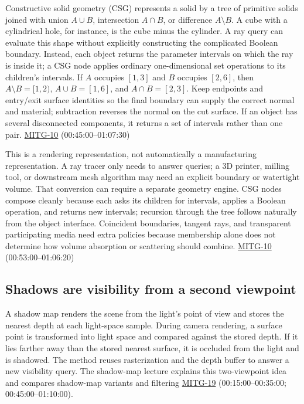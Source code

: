 Constructive solid geometry (CSG) represents a solid by a tree of primitive solids joined with union \(A\cup B\), intersection \(A\cap B\), or difference \(A\setminus B\). A cube with a cylindrical hole, for instance, is the cube minus the cylinder. A ray query can evaluate this shape without explicitly constructing the complicated Boolean boundary. Instead, each object returns the parameter intervals on which the ray is inside it; a CSG node applies ordinary one-dimensional set operations to its children's intervals. If \(A\) occupies \([1,3]\) and \(B\) occupies \([2,6]\), then \(A\setminus B=[1,2)\), \(A\cup B=[1,6]\), and \(A\cap B=[2,3]\). Keep endpoints and entry/exit surface identities so the final boundary can supply the correct normal and material; subtraction reverses the normal on the cut surface. If an object has several disconnected components, it returns a set of intervals rather than one pair. \hyperref[04-visual-computing-ii-ch036-mitg-10---ray-casting-ii]{MITG-10} (00:45:00--01:07:30)

This is a rendering representation, not automatically a manufacturing representation. A ray tracer only needs to answer queries; a 3D printer, milling tool, or downstream mesh algorithm may need an explicit boundary or watertight volume. That conversion can require a separate geometry engine. CSG nodes compose cleanly because each asks its children for intervals, applies a Boolean operation, and returns new intervals; recursion through the tree follows naturally from the object interface. Coincident boundaries, tangent rays, and transparent participating media need extra policies because membership alone does not determine how volume absorption or scattering should combine. \hyperref[04-visual-computing-ii-ch036-mitg-10---ray-casting-ii]{MITG-10} (00:53:00--01:06:20)

\subsection{Shadows are visibility from a second viewpoint}\label{04-visual-computing-ii-ch028-shadows-are-visibility-from-a-second-viewpoint}

A shadow map renders the scene from the light's point of view and stores the nearest depth at each light-space sample. During camera rendering, a surface point is transformed into light space and compared against the stored depth. If it lies farther away than the stored nearest surface, it is occluded from the light and is shadowed. The method reuses rasterization and the depth buffer to answer a new visibility query. The shadow-map lecture explains this two-viewpoint idea and compares shadow-map variants and filtering \hyperref[04-visual-computing-ii-ch036-mitg-19---shadow-maps]{MITG-19} (00:15:00--00:35:00; 00:45:00--01:10:00).

